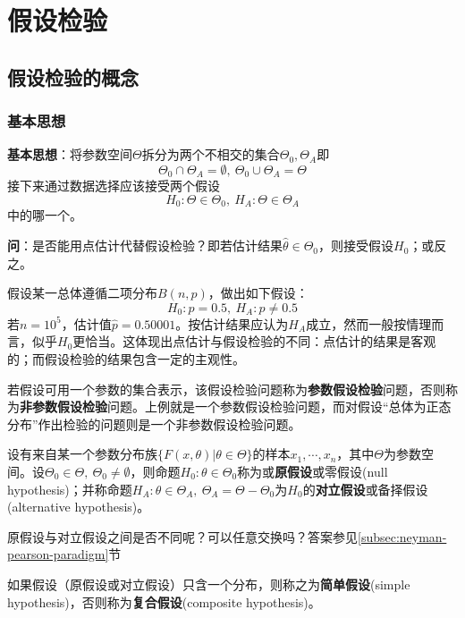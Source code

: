 \chapter{假设检验}

\section{假设检验的概念}

\subsection{基本思想}

\textbf{基本思想}：将参数空间$\Theta$拆分为两个不相交的集合$\Theta_0, \Theta_A$即
\[ \Theta_0 \cap \Theta_A=\emptyset,\ \Theta_0 \cup \Theta_A=\Theta \]
接下来通过数据选择应该接受两个假设
\[ H_0:\Theta \in \Theta_0,\ H_A:\Theta \in \Theta_A \]
中的哪一个。

\textbf{问}：是否能用点估计代替假设检验？即若估计结果$\hat{\theta} \in \Theta_0$，则接受假设$H_0$；或反之。

假设某一总体遵循二项分布$B(n,p)$，做出如下假设：
\[ H_0:p=0.5,\ H_A : p \neq 0.5 \]
若$n=10^5$，估计值$\hat{p}=0.50001$。按估计结果应认为$H_A$成立，然而一般按情理而言，似乎$H_0$更恰当。这体现出点估计与假设检验的不同：点估计的结果是客观的；而假设检验的结果包含一定的主观性。

若假设可用一个参数的集合表示，该假设检验问题称为\textbf{参数假设检验}问题，否则称为\textbf{非参数假设检验}问题。上例就是一个参数假设检验问题，而对假设“总体为正态分布”作出检验的问题则是一个非参数假设检验问题。

\begin{definition}[原假设与对立假设]
    设有来自某一个参数分布族$\{ F(x,\theta) | \theta \in \Theta \}$的样本$x_1,\cdots ,x_n$，其中$\Theta$为参数空间。设$\Theta_0 \in \Theta,\ \Theta_0 \neq \emptyset$，则命题$ H_0:\theta \in \Theta_0$称为或\textbf{原假设}或零假设(null hypothesis)；并称命题$H_A:\theta \in \Theta_A,\ \Theta_A=\Theta-\Theta_0$为$H_0$的\textbf{对立假设}或备择假设(alternative hypothesis)。
\end{definition}
\begin{remark}
    原假设与对立假设之间是否不同呢？可以任意交换吗？答案参见\ref{subsec:neyman-pearson-paradigm}节
\end{remark}

\begin{definition}
    如果假设（原假设或对立假设）只含一个分布，则称之为\textbf{简单假设}(simple hypothesis)，否则称为\textbf{复合假设}(composite hypothesis)。
\end{definition}

